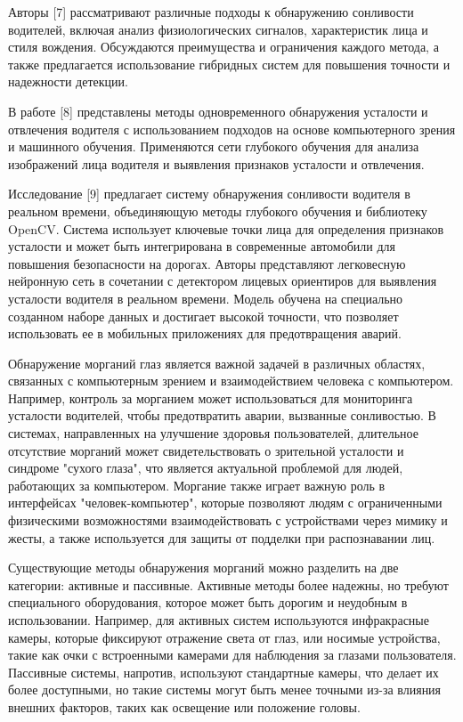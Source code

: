 \documentclass[
]{article}
\begin{document}
Авторы {[}7{]} рассматривают различные подходы к обнаружению сонливости
водителей, включая анализ физиологических сигналов, характеристик лица и
стиля вождения. Обсуждаются преимущества и ограничения каждого метода, а
также предлагается использование гибридных систем для повышения точности
и надежности детекции.

В работе {[}8{]} представлены методы одновременного обнаружения
усталости и отвлечения водителя с использованием подходов на основе
компьютерного зрения и машинного обучения. Применяются сети глубокого
обучения для анализа изображений лица водителя и выявления признаков
усталости и отвлечения.

Исследование {[}9{]} предлагает систему обнаружения сонливости водителя
в реальном времени, объединяющую методы глубокого обучения и библиотеку
OpenCV. Система использует ключевые точки лица для определения признаков
усталости и может быть интегрирована в современные автомобили для
повышения безопасности на дорогах. Авторы представляют легковесную
нейронную сеть в сочетании с детектором лицевых ориентиров для выявления
усталости водителя в реальном времени. Модель обучена на специально
созданном наборе данных и достигает высокой точности, что позволяет
использовать ее в мобильных приложениях для предотвращения аварий.

Обнаружение морганий глаз является важной задачей в различных областях,
связанных с компьютерным зрением и взаимодействием человека с
компьютером. Например, контроль за морганием может использоваться для
мониторинга усталости водителей, чтобы предотвратить аварии, вызванные
сонливостью. В системах, направленных на улучшение здоровья
пользователей, длительное отсутствие морганий может свидетельствовать о
зрительной усталости и синдроме "сухого глаза", что является актуальной
проблемой для людей, работающих за компьютером. Моргание также играет
важную роль в интерфейсах "человек-компьютер", которые позволяют людям с
ограниченными физическими возможностями взаимодействовать с устройствами
через мимику и жесты, а также используется для защиты от подделки при
распознавании лиц.

Существующие методы обнаружения морганий можно разделить на две
категории: активные и пассивные. Активные методы более надежны, но
требуют специального оборудования, которое может быть дорогим и
неудобным в использовании. Например, для активных систем используются
инфракрасные камеры, которые фиксируют отражение света от глаз, или
носимые устройства, такие как очки с встроенными камерами для наблюдения
за глазами пользователя. Пассивные системы, напротив, используют
стандартные камеры, что делает их более доступными, но такие системы
могут быть менее точными из-за влияния внешних факторов, таких как
освещение или положение головы.
\end{document}
